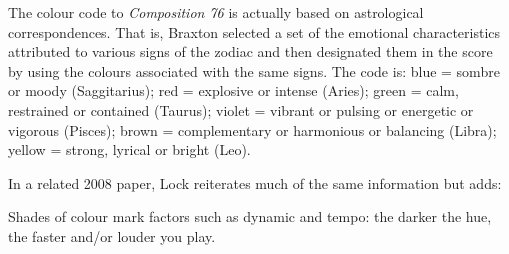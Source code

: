            \begin{smallquote}
                The colour code to \textit{Composition 76} is actually based on astrological correspondences. That is, Braxton selected a set of the emotional characteristics attributed to various signs of the zodiac and then designated them in the score by using the colours associated with the same signs. The code is: blue = sombre or moody (Saggitarius); red = explosive or intense (Aries); green = calm, restrained or contained (Taurus); violet = vibrant or pulsing or energetic or vigorous (Pisces); brown = complementary or harmonious or balancing (Libra); yellow = strong, lyrical or bright (Leo).\autocite[222]{Lock_1989}
            \end{smallquote}
        
        In a related 2008 paper, Lock reiterates much of the same information but adds:
        
            \begin{smallquote}
                Shades of colour mark factors such as dynamic and tempo: the darker the hue, the faster and/or louder you play.\autocite{Lock_2008}
            \end{smallquote}
    
